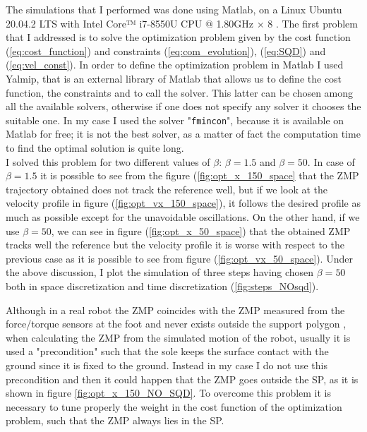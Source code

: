 \documentclass[a4paper]{article}
\begin{document}
The simulations that I performed was done using Matlab, on a Linux Ubuntu 20.04.2 LTS with Intel Core™ i7-8550U CPU @ 1.80GHz × 8 . The first problem that I addressed is to solve the optimization problem given by the cost function (\ref{eq:cost_function}) and constraints (\ref{eq:com_evolution}), (\ref{eq:SQD}) and (\ref{eq:vel_const}). 
In order to define the optimization problem in Matlab I used Yalmip, that is an external library of Matlab that allows us to define the cost function, the constraints and to call the solver. This latter can be chosen among all the available solvers, otherwise if one does not specify any solver it chooses the suitable one. In my case I used the solver "\verb+fmincon+", because it is available on Matlab for free; it is not the best solver, as a matter of fact the computation time to find the optimal solution is quite long.\\
I solved this problem for two different values of $\beta$: $\beta = 1.5$ and 
$\beta = 50$. In case of $\beta = 1.5$ it is possible to see from the figure (\ref{fig:opt_x_150_space} that the ZMP trajectory obtained does not track the reference well, but if we look at the velocity profile in figure (\ref{fig:opt_vx_150_space}), it follows the desired profile as much as possible except for the unavoidable oscillations. On the other hand, if we use 
$\beta = 50$, we can see in figure (\ref{fig:opt_x_50_space}) that the obtained ZMP  tracks well the reference  but the velocity profile it is worse with respect to the previous case as it is possible to see from figure (\ref{fig:opt_vx_50_space}).
Under the above discussion, I plot the simulation of three steps having chosen $\beta=50$  both in space discretization and time discretization  (\ref{fig:steps_NOsqd}).

Although in a real robot the ZMP coincides with the ZMP measured from the force/torque sensors at the foot and never exists outside the support polygon \cite{HumanBook}, when calculating the ZMP from the simulated motion of the robot, usually it is used a "precondition" such that the sole keeps the surface contact with the ground since it is fixed to the ground. Instead in my case I do not use this precondition and then it could happen that the ZMP goes outside the SP, as it is shown in figure \ref{fig:opt_x_150_NO_SQD}. To overcome this problem it is necessary to tune properly the weight in the cost function of the optimization problem, such that the ZMP always lies in the SP.
\end{document}
